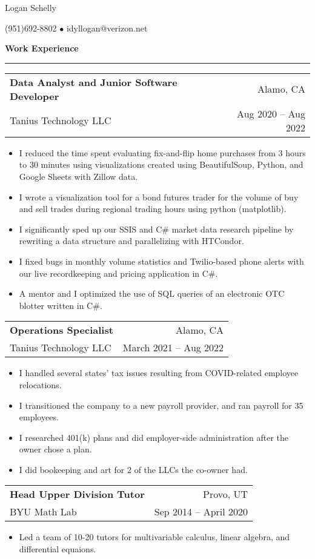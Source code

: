 \documentclass[12pt]{article}
\newenvironment{compactItemize}{
  \begin{itemize}[itemsep=0ex, parsep=0ex, partopsep=0ex, topsep= -7pt]
}{
  \end{itemize}
}
\newcommand{\jobInfo}[4]{
  \begingroup
  \setlength{\tabcolsep}{0ex}
  \begin{tabularx}{\linewidth}{X r}
    #1 & %
    #2\\ %
    #3 & %
    #4   %
  \end{tabularx}%
  \endgroup%
}
\begin{document}
\begin{center}
{\Large Logan Schelly} %

(951)\phantom{-}692-8802 %
$\bullet$ %
idyllogan@verizon.net %
\end{center}

\textbf{Work Experience}
\smallskip
\hrule

\jobInfo{\textbf{Data Analyst and Junior Software Developer}}{Alamo, CA}{Tanius Technology LLC}{Aug 2020 -- Aug 2022}
\begin{compactItemize}
  \item I reduced the time spent evaluating fix-and-flip home purchases from 3 hours to 30 minutes using visualizations
        created using BeautifulSoup, Python, and Google Sheets with Zillow data.
  \item I wrote a visualization tool for a bond futures trader for the volume of buy and sell trades during regional trading hours using python (matplotlib).
  \item I significantly sped up our SSIS and C\# market data research pipeline by rewriting a data structure and parallelizing with HTCondor.
  \item I fixed bugs in monthly volume statistics and Twilio-based phone alerts with our live recordkeeping and pricing application in C\#.
  \item A mentor and I optimized the use of SQL queries of an electronic OTC blotter written in C\#.
\end{compactItemize}
\smallskip
\jobInfo{\textbf{Operations Specialist}}{Alamo, CA}{Tanius Technology LLC}{March 2021 -- Aug 2022}
\begin{compactItemize}
  \item I handled several states' tax issues resulting from COVID-related employee relocations.
  \item I transitioned the company to a new payroll provider, and ran payroll for 35 employees.
  \item I researched 401(k) plans and did employer-side administration after the owner chose a plan.
  \item I did bookeeping and art for 2 of the LLCs the co-owner had.
\end{compactItemize}
\smallskip
\jobInfo{\textbf{Head Upper Division Tutor}}{Provo, UT}{BYU Math Lab}{Sep 2014 -- April 2020}
\begin{compactItemize}
  \item Led a team of 10-20 tutors for multivariable calculus, linear algebra, and differential equaions.
\end{compactItemize}
\medskip
\end{document}
